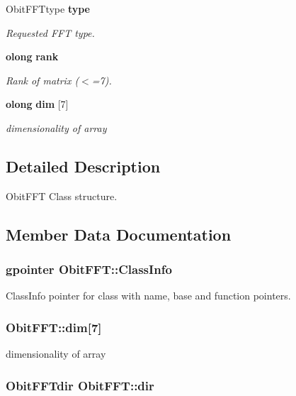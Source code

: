 \begin{CompactItemize}
Obit\-FFTtype {\bf type}
\begin{CompactList}\small\item\em Requested FFT type. \item\end{CompactList}\item 
{\bf olong} {\bf rank}
\begin{CompactList}\small\item\em Rank of matrix ($<$=7). \item\end{CompactList}\item 
{\bf olong} {\bf dim} [7]
\begin{CompactList}\small\item\em dimensionality of array \item\end{CompactList}\end{CompactItemize}


\subsection{Detailed Description}
Obit\-FFT Class structure. 



\subsection{Member Data Documentation}
\subsubsection{\setlength{\rightskip}{0pt plus 5cm}gpointer {\bf Obit\-FFT::Class\-Info}}\label{structObitFFT_o1}


Class\-Info pointer for class with name, base and function pointers. 

\subsubsection{ {\bf Obit\-FFT::dim}[7]}\label{structObitFFT_o8}


dimensionality of array 

\subsubsection{\setlength{\rightskip}{0pt plus 5cm}Obit\-FFTdir {\bf Obit\-FFT::dir}}\label{structObitFFT_o5}


